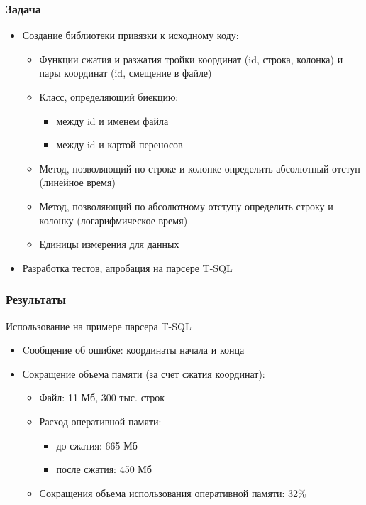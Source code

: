 \documentclass{beamer}
\begin{document}
\begin{frame}
	\transwipe[direction=90]
	\frametitle{Задача}
	\begin{itemize}
        \item Создание библиотеки привязки к исходному коду:
        	\begin{itemize}
                \item Функции сжатия и разжатия тройки координат (id, строка, колонка) и пары координат (id, смещение в файле)
                \item Класс, определяющий биекцию:
                    \begin{itemize}
                        \item между id и именем файла
                        \item между id и картой переносов
	                \end{itemize}
                \item Метод, позволяющий по строке и колонке определить абсолютный отступ (линейное время)
                \item Метод, позволяющий по абсолютному отступу определить строку и колонку (логарифмическое время)
                \item Единицы измерения для данных
            \end{itemize}
        \item Разработка тестов, апробация на парсере T-SQL
    \end{itemize}
\end{frame}    

\begin{frame}
	\transwipe[direction=90]
	\frametitle{Результаты}
	Использование на примере парсера T-SQL
	\begin{itemize}
        \item Cообщение об ошибке: координаты начала и конца
        \item Сокращение объема памяти (за счет сжатия координат):
        \begin{itemize}
            \item Файл: 11 Мб, 300 тыс. строк
            \item Расход оперативной памяти:
            \begin{itemize}
         		\item до сжатия: 665 Мб
          		\item после сжатия: 450 Мб
		    \end{itemize}
            \item Сокращения объема использования оперативной памяти: 32\%
        \end{itemize}
    \end{itemize}
\end{frame}
\end{document}
